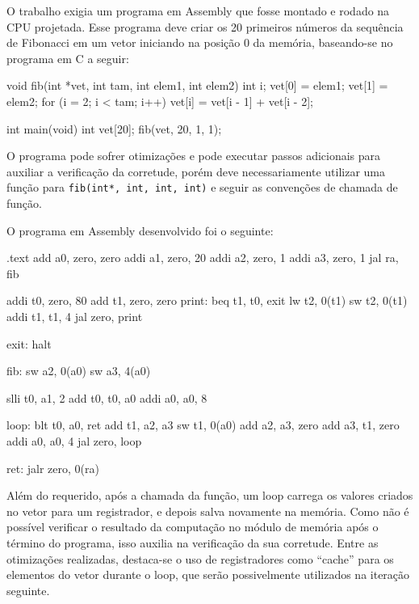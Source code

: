 \documentclass[twocolumn]{article}
\begin{document}
O trabalho exigia um programa em Assembly que fosse montado e rodado na CPU
projetada. Esse programa deve criar os 20 primeiros números da sequência de
Fibonacci em um vetor iniciando na posição 0 da memória, baseando-se no programa
em C a seguir:

\begin{spverbatim}
void fib(int *vet, int tam, int elem1, int elem2)
{
        int i;
        vet[0] = elem1;
        vet[1] = elem2;
        for (i = 2; i < tam; i++) {
                vet[i] = vet[i - 1] + vet[i - 2];
        }
}

int main(void)
{
        int vet[20];
        fib(vet, 20, 1, 1);
}
\end{spverbatim}

O programa pode sofrer otimizações e pode executar passos adicionais para
auxiliar a verificação da corretude, porém deve necessariamente utilizar uma
função para \verb|fib(int*, int, int, int)| e seguir as convenções de chamada de
função.

O programa em Assembly desenvolvido foi o seguinte:

\begin{spverbatim}
.text
        add a0, zero, zero
        addi a1, zero, 20
        addi a2, zero, 1
        addi a3, zero, 1
        jal ra, fib

        addi t0, zero, 80
        add t1, zero, zero
        print:	beq t1, t0, exit
        lw t2, 0(t1)
        sw t2, 0(t1)
        addi t1, t1, 4
        jal zero, print

exit:	halt

fib:    sw a2, 0(a0)
        sw a3, 4(a0)

        slli t0, a1, 2
        add t0, t0, a0
        addi a0, a0, 8

loop:   blt t0, a0, ret
        add t1, a2, a3
        sw t1, 0(a0)
        add a2, a3, zero
        add a3, t1, zero
        addi a0, a0, 4
        jal zero, loop

ret:    jalr zero, 0(ra)
\end{spverbatim}

Além do requerido, após a chamada da função, um loop carrega os valores criados
no vetor para um registrador, e depois salva novamente na memória. Como não é
possível verificar o resultado da computação no módulo de memória após o término
do programa, isso auxilia na verificação da sua corretude. Entre as otimizações
realizadas, destaca-se o uso de registradores como ``cache'' para os elementos
do vetor durante o loop, que serão possivelmente utilizados na iteração
seguinte.
\end{document}
